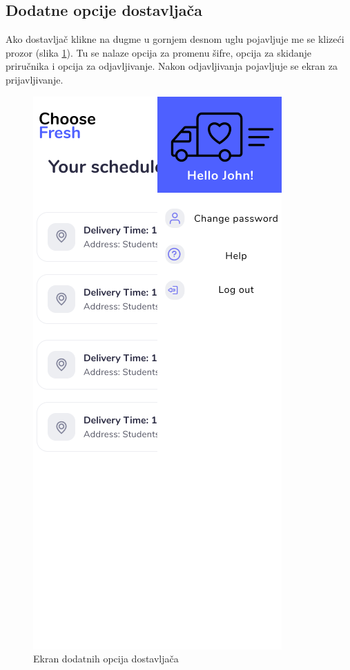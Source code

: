 \subsection{Dodatne opcije dostavljača}

Ako dostavljač klikne na dugme u gornjem desnom uglu pojavljuje me se klizeći prozor (slika \ref{fig:DeliverymanSettings}). Tu se nalaze opcija za promenu šifre, opcija za skidanje priručnika i opcija za odjavljivanje. Nakon odjavljivanja pojavljuje se ekran za prijavljivanje.  

\begin{figure}[H]
	\begin{center}
		\includegraphics[scale=0.3]{UI/deliveryman_settings.png}
    		\caption{Ekran dodatnih opcija dostavljača}
    \label{fig:DeliverymanSettings}
    \end{center}
\end{figure}
